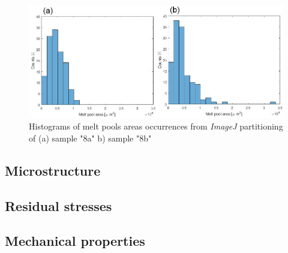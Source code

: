 \begin{figure}[ht]
\centering
\centerline{\includegraphics[scale=0.7]{Images/HistB1}}
\decoRule
\caption[Histograms of melt pools areas occurrences from \textit{ImageJ} partitioning of (a) sample "8a"  b) sample "8b"]{Histograms of melt pools areas occurrences from \textit{ImageJ} partitioning of (a) sample "8a"  b) sample "8b"}
\label{fig:HistB1}
\end{figure} 

 \begin{center}
\begin{table}[ht]
\noindent{}

\caption[Summary of the melt pools areas distributions for samples "8a" and "8b"]{Summary of the melt pools areas distributions for samples "8a" and "8b"}
\label{tab:tracMAB}
\end{table}
 \end{center}

\subsection{Microstructure}


\subsection{Residual stresses}

\subsection{Mechanical properties}

